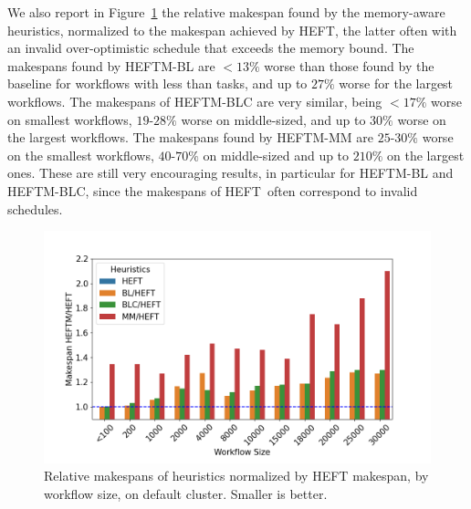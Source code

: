 \documentclass[conference]{IEEEtran}
\newcommand{\algo}[1]{\textsc{#1}}
\newcommand{\heft}{\algo{HEFT}\xspace}
\newcommand{\heftmm}{\algo{HEFTM-MM}\xspace}
\newcommand{\heftbl}{\algo{HEFTM-BL}\xspace}
\newcommand{\heftblc}{\algo{HEFTM-BLC}\xspace}
\newcommand{\new}[1]{{\color{blue}#1}}
\newcommand{\skug}[1]{{\color{blue}[SK: #1]}}
\begin{document}
We also report in  Figure~\ref{fig:ms-relations-by-workflow} the relative makespan found
by the memory-aware heuristics, normalized to the
makespan achieved by \heft, \new{the latter} often with an invalid over-optimistic schedule that exceeds
the memory bound.
\new{The makespans found by \heftbl are $<13\%$ worse than those found by the baseline for workflows with less than \numprint{2000}
tasks, and up to $27\%$ worse for the largest workflows.
The makespans of \heftblc are very similar, being $<17\%$ worse on smallest workflows, $19$-$28\%$ worse on middle-sized,
and up to $30\%$ worse on the largest workflows.
The makespans found by \heftmm are $25$-$30\%$ worse on the smallest workflows, $40$-$70\%$ on middle-sized and up to
$210\%$ on the largest ones.} These are still very encouraging results,
in particular for \heftbl and \heftblc, since the makespans of \heft\ \new{often} correspond to invalid schedules.



%


\begin{figure}[tb]
    \centering
  \includegraphics[width=1\columnwidth] {images/ms_relations_by_wf_size_barplot}
    \caption{Relative makespans of heuristics normalized by \heft makespan, by workflow
    size, on default cluster. Smaller is better.}
    \label{fig:ms-relations-by-workflow}
\end{figure}
\end{document}
